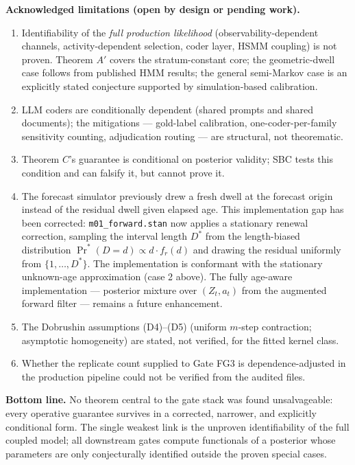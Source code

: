 \documentclass[11pt,a4paper]{article}
\begin{document}
\textbf{Acknowledged limitations (open by design or pending work).}
\begin{enumerate}
    \item Identifiability of the \emph{full production likelihood} (observability-dependent channels, activity-dependent selection, coder layer, HSMM coupling) is not proven. Theorem $A'$ covers the stratum-constant core; the geometric-dwell case follows from published HMM results; the general semi-Markov case is an explicitly stated conjecture supported by simulation-based calibration.
    \item LLM coders are conditionally dependent (shared prompts and shared documents); the mitigations --- gold-label calibration, one-coder-per-family sensitivity counting, adjudication routing --- are structural, not theorematic.
    \item Theorem $C$'s guarantee is conditional on posterior validity; SBC tests this condition and can falsify it, but cannot prove it.
    \item The forecast simulator previously drew a fresh dwell at the forecast origin instead of the residual dwell given elapsed age. This implementation gap has been corrected: \texttt{m01\_forward.stan} now applies a stationary renewal correction, sampling the interval length $D^*$ from the length-biased distribution $\Pr^*(D = d) \propto d \cdot f_r(d)$ and drawing the residual uniformly from $\{1, \dots, D^*\}$. The implementation is conformant with the stationary unknown-age approximation (case 2 above). The fully age-aware implementation --- posterior mixture over $(Z_t, a_t)$ from the augmented forward filter --- remains a future enhancement.
    \item The Dobrushin assumptions (D4)--(D5) (uniform $m$-step contraction; asymptotic homogeneity) are stated, not verified, for the fitted kernel class.
    \item Whether the replicate count supplied to Gate FG3 is dependence-adjusted in the production pipeline could not be verified from the audited files.
\end{enumerate}

\textbf{Bottom line.} No theorem central to the gate stack was found unsalvageable: every operative guarantee survives in a corrected, narrower, and explicitly conditional form. The single weakest link is the unproven identifiability of the full coupled model; all downstream gates compute functionals of a posterior whose parameters are only conjecturally identified outside the proven special cases.
\end{document}
